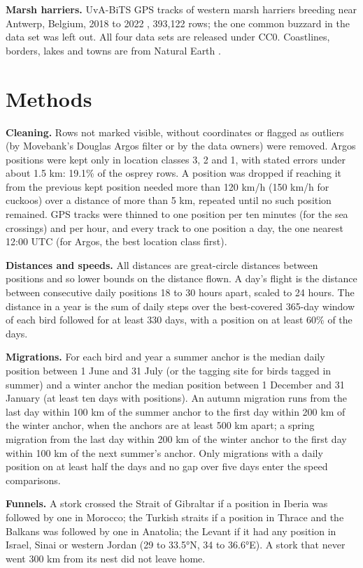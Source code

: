 \documentclass[11pt,a4paper]{article}
\begin{document}
\textbf{Marsh harriers.} UvA-BiTS GPS tracks of western marsh harriers breeding near Antwerp, Belgium, 2018 to 2022 \citep{inbo}, 393,122 rows; the one common buzzard in the data set was left out. All four data sets are released under CC0. Coastlines, borders, lakes and towns are from Natural Earth \citep{naturalearth}.

\section{Methods}
\textbf{Cleaning.} Rows not marked visible, without coordinates or flagged as outliers (by Movebank's Douglas Argos filter \citep{douglas2012} or by the data owners) were removed. Argos positions were kept only in location classes 3, 2 and 1, with stated errors under about 1.5 km: 19.1\% of the osprey rows. A position was dropped if reaching it from the previous kept position needed more than 120 km/h (150 km/h for cuckoos) over a distance of more than 5 km, repeated until no such position remained. GPS tracks were thinned to one position per ten minutes (for the sea crossings) and per hour, and every track to one position a day, the one nearest 12:00 UTC (for Argos, the best location class first).

\textbf{Distances and speeds.} All distances are great-circle distances between positions and so lower bounds on the distance flown. A day's flight is the distance between consecutive daily positions 18 to 30 hours apart, scaled to 24 hours. The distance in a year is the sum of daily steps over the best-covered 365-day window of each bird followed for at least 330 days, with a position on at least 60\% of the days.

\textbf{Migrations.} For each bird and year a summer anchor is the median daily position between 1 June and 31 July (or the tagging site for birds tagged in summer) and a winter anchor the median position between 1 December and 31 January (at least ten days with positions). An autumn migration runs from the last day within 100 km of the summer anchor to the first day within 200 km of the winter anchor, when the anchors are at least 500 km apart; a spring migration from the last day within 200 km of the winter anchor to the first day within 100 km of the next summer's anchor. Only migrations with a daily position on at least half the days and no gap over five days enter the speed comparisons.

\textbf{Funnels.} A stork crossed the Strait of Gibraltar if a position in Iberia was followed by one in Morocco; the Turkish straits if a position in Thrace and the Balkans was followed by one in Anatolia; the Levant if it had any position in Israel, Sinai or western Jordan (29 to 33.5°N, 34 to 36.6°E). A stork that never went 300 km from its nest did not leave home.
\end{document}
